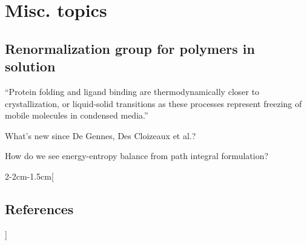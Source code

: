 \documentclass[notitlepage,openany,11pt]{report}
\theoremstyle{plain}%
\numberwithin{equation}{section}
\begin{document}
\chapter{Misc. topics}
\section{Renormalization group for polymers in solution}

``Protein folding and ligand binding are thermodynamically closer to crystallization, or liquid-solid transitions as these processes represent freezing of mobile molecules in condensed media.''

What's new since De Gennes, Des Cloizeaux et al.?

How do we see energy-entropy balance from path integral formulation?



\clearpage
{} %

\let\oldthebibliography=\thebibliography
\let\endoldthebibliography=\endthebibliography
\renewenvironment{thebibliography}[1]{%
    \begin{oldthebibliography}{#1}%
    \setlength{\parskip}{3pt plus 2pt minus 1pt}%
    \setlength{\itemsep}{3pt}%
}%
{%
    \end{oldthebibliography}%
}

\begin{adjmulticols*}{2}{-2cm}{-1.5cm}[\section*{References}] %

\noindent
\footnotesize %
\begin{flushleft}


\end{flushleft}
\normalsize

\end{adjmulticols*}
\end{document}
